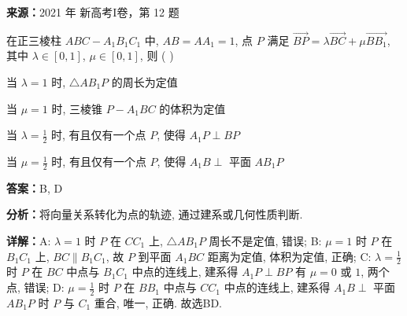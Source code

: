 \begin{question}[points=5]
\textbf{来源：}2021 年 新高考I卷，第 12 题\par
在正三棱柱 $ABC-A_1B_1C_1$ 中, $AB = AA_1 = 1$, 点 $P$ 满足 $\overrightarrow{BP} = \lambda \overrightarrow{BC} + \mu \overrightarrow{BB_1}$, 其中 $\lambda \in [0,1]$, $\mu \in [0,1]$, 则 ( )
\begin{choices}
  \item 当 $\lambda = 1$ 时, $\triangle AB_1P$ 的周长为定值
  \item 当 $\mu = 1$ 时, 三棱锥 $P-A_1BC$ 的体积为定值
  \item 当 $\lambda = \frac{1}{2}$ 时, 有且仅有一个点 $P$, 使得 $A_1P \perp BP$
  \item 当 $\mu = \frac{1}{2}$ 时, 有且仅有一个点 $P$, 使得 $A_1B \perp$ 平面 $AB_1P$
\end{choices}
\begin{solution}
\textbf{答案：}B, D

\textbf{分析：}将向量关系转化为点的轨迹, 通过建系或几何性质判断.

\textbf{详解：}A: $\lambda = 1$ 时 $P$ 在 $CC_1$ 上, $\triangle AB_1P$ 周长不是定值, 错误; B: $\mu = 1$ 时 $P$ 在 $B_1C_1$ 上, $BC \parallel B_1C_1$, 故 $P$ 到平面 $A_1BC$ 距离为定值, 体积为定值, 正确; C: $\lambda = \frac{1}{2}$ 时 $P$ 在 $BC$ 中点与 $B_1C_1$ 中点的连线上, 建系得 $A_1P \perp BP$ 有 $\mu=0$ 或 $1$, 两个点, 错误; D: $\mu = \frac{1}{2}$ 时 $P$ 在 $BB_1$ 中点与 $CC_1$ 中点的连线上, 建系得 $A_1B \perp$ 平面 $AB_1P$ 时 $P$ 与 $C_1$ 重合, 唯一, 正确. 故选BD.
\end{solution}
\end{question}

